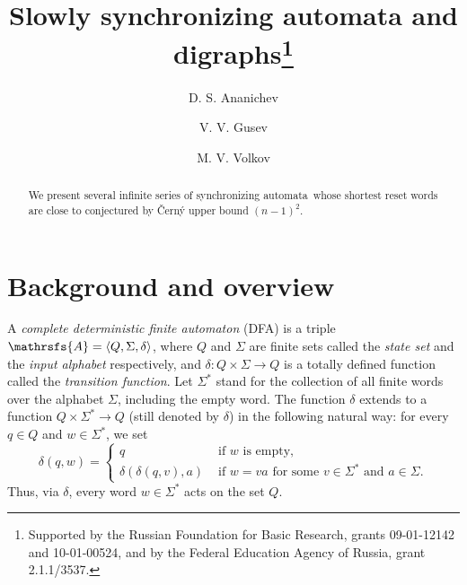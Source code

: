 \documentclass[11pt]{llncs}
\newcommand{\sa}{synchronizing automata}
\begin{document}
\title{Slowly synchronizing automata and digraphs\thanks{Supported
by the Russian Foundation for Basic Research, grants 09-01-12142
and 10-01-00524, and by the Federal Education Agency of Russia,
grant 2.1.1/3537.}}


\author{D. S. Ananichev \and V. V. Gusev \and M. V. Volkov}




\maketitle

\begin{abstract}
We present several infinite series of \sa\
whose shortest reset words are close to conjectured by \v{C}ern\'{y} upper bound $(n - 1)^2$.
\end{abstract}


\section{Background and overview}

A \emph{complete deterministic finite automaton} (DFA) is a triple
$\mathrsfs{A}=\langle Q,\Sigma,\delta\rangle$, where $Q$ and
$\Sigma$ are finite sets called the \emph{state set} and the
\emph{input alphabet} respectively, and $\delta:Q\times\Sigma\to
Q$ is a totally defined function called the \emph{transition
function}. Let $\Sigma^*$ stand for the collection of all finite
words over the alphabet $\Sigma$, including the empty word.
The function $\delta$ extends to a function $Q\times\Sigma^*\to Q$
(still denoted by $\delta$) in the following natural way: for every
$q\in Q$ and $w\in\Sigma^*$, we set
$$\delta(q,w)=\begin{cases}
q &\text{ if $w$ is empty},\\
\delta(\delta(q,v),a) &\text{ if $w=va$ for some $v\in\Sigma^*$ and $a\in\Sigma$}.
\end{cases}$$
Thus, via $\delta$, every word $w\in\Sigma^*$ acts on the set $Q$.
\end{document}
